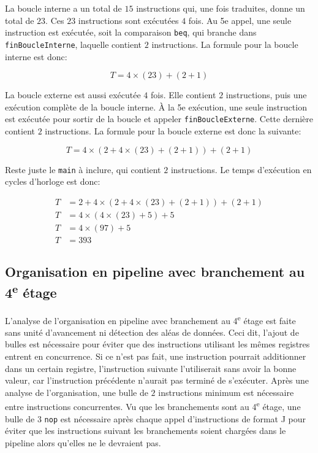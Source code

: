 \documentclass[a11paper]{article}
\newcommand{\todo}[1]{\begin{color}{Red}\textbf{TODO:} #1\end{color}}
\begin{document}
La boucle interne a un total de $15$ instructions qui, une fois traduites,
donne un total de $23$. Ces $23$ instructions sont exécutées $4$ fois. Au 5e
appel, une seule instruction est exécutée, soit la comparaison \verb|beq|, qui
branche dans \verb|finBoucleInterne|, laquelle contient $2$ instructions. La
formule pour la boucle interne est donc:

\begin{equation}
  T = 4\times(23)+(2+1)
\end{equation}

La boucle externe est aussi exécutée $4$ fois. Elle contient $2$ instructions,
puis une exécution complète de la boucle interne. À la 5e exécution, une seule
instruction est exécutée pour sortir de la boucle et appeler
\verb|finBoucleExterne|. Cette dernière contient $2$ instructions. La formule
pour la boucle externe est donc la suivante:

\begin{equation}
T = 4\times(2+4\times(23)+(2+1)) + (2+1)
\end{equation}

Reste juste le \verb|main| à inclure, qui contient $2$ instructions. Le temps
d'exécution en cycles d'horloge est donc:

\begin{align}
  T &= 2+ 4\times(2+4\times(23)+(2+1)) + (2+1) \\
  T &= 4\times(4\times(23)+5) + 5 \\
  T &= 4\times(97) + 5 \\
  T &= 393
\end{align}

\subsection{Organisation en pipeline avec branchement au 4\textsuperscript{e} étage}


L'analyse de l'organisation en pipeline avec branchement au 4\textsuperscript{e}
étage est faite sans unité d'avancement ni détection des aléas de données. Ceci
dit, l'ajout de bulles est nécessaire pour éviter que des instructions utilisant
les mêmes registres entrent en concurrence. Si ce n'est pas fait, une
instruction pourrait additionner dans un certain registre, l'instruction
suivante l'utiliserait sans avoir la bonne valeur, car l'instruction
précédente n'aurait pas terminé de s'exécuter. Après une analyse de
l'organisation, une bulle de $2$ instructions minimum est nécessaire entre
instructions concurrentes. Vu que les branchements sont au 4\textsuperscript{e}
étage, une bulle de $3$ \verb|nop| est nécessaire après chaque appel
d'instructions de format J pour éviter que les instructions suivant les
branchements soient chargées dans le pipeline alors qu'elles ne le devraient pas.
\end{document}
